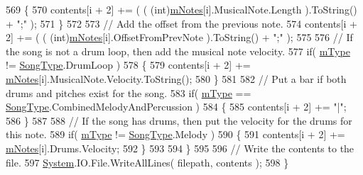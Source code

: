 \begin{DoxyCode}
569             \{
570                 contents[i + 2] += ( ( (int)\hyperlink{group___song_priv_var_ga674bc904a1f856d485d5fb7fe84bac85}{mNotes}[i].MusicalNote.Length ).ToString() + \textcolor{stringliteral}{";"} );
571             \}
572 
573             \textcolor{comment}{// Add the offset from the previous note.}
574             contents[i + 2] += ( ( (int)\hyperlink{group___song_priv_var_ga674bc904a1f856d485d5fb7fe84bac85}{mNotes}[i].OffsetFromPrevNote ).ToString() + \textcolor{stringliteral}{";"} );
575 
576             \textcolor{comment}{// If the song is not a drum loop, then add the musical note velocity.}
577             \textcolor{keywordflow}{if}( \hyperlink{group___song_priv_var_gaf3b9d0f461522324f897b746311b43c5}{mType} != \hyperlink{group___song_enums_gae681a1f001333e39fc1cb4fea97bfe1b}{SongType}.DrumLoop )
578             \{
579                 contents[i + 2] += \hyperlink{group___song_priv_var_ga674bc904a1f856d485d5fb7fe84bac85}{mNotes}[i].MusicalNote.Velocity.ToString();
580             \}
581 
582             \textcolor{comment}{// Put a bar if both drums and pitches exist for the song.}
583             \textcolor{keywordflow}{if}( \hyperlink{group___song_priv_var_gaf3b9d0f461522324f897b746311b43c5}{mType} == \hyperlink{group___song_enums_gae681a1f001333e39fc1cb4fea97bfe1b}{SongType}.CombinedMelodyAndPercussion )
584             \{
585                 contents[i + 2] += \textcolor{stringliteral}{"|"};
586             \}
587 
588             \textcolor{comment}{// If the song has drums, then put the velocity for the drums for this note.}
589             \textcolor{keywordflow}{if}( \hyperlink{group___song_priv_var_gaf3b9d0f461522324f897b746311b43c5}{mType} != \hyperlink{group___song_enums_gae681a1f001333e39fc1cb4fea97bfe1b}{SongType}.Melody )
590             \{
591                 contents[i + 2] += \hyperlink{group___song_priv_var_ga674bc904a1f856d485d5fb7fe84bac85}{mNotes}[i].Drums.Velocity;
592             \}
593 
594         \}
595 
596         \textcolor{comment}{// Write the contents to the file.}
597         \hyperlink{namespace_system}{System}.IO.File.WriteAllLines( filepath, contents );
598     \}
\end{DoxyCode}
